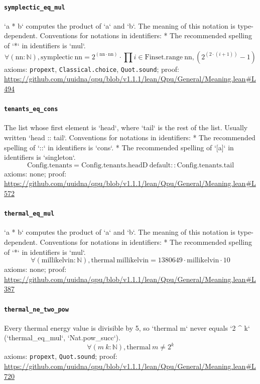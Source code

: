 \documentclass[11pt]{article}
\begin{document}
\paragraph{\texttt{symplectic\_eq\_mul}}
`a * b` computes the product of `a` and `b`. The meaning of this notation is type-dependent.   Conventions for notations in identifiers:   * The recommended spelling of `*` in identifiers is `mul`.
\[ \forall (\mathrm{nn} : \mathbb{N}), \mathrm{symplectic}\ \mathrm{nn} = 2 ^{(\mathrm{nn} \cdot \mathrm{nn})} \cdot \prod i \in \mathrm{Finset.range}\ \mathrm{nn}, (2 ^{(2 \cdot (i + 1))} - 1) \]
\noindent axioms: \texttt{propext}, \texttt{Classical.choice}, \texttt{Quot.sound}; proof: \url{https://github.com/uuidna/qpu/blob/v1.1.1/lean/Qpu/General/Meaning.lean\#L494}

\paragraph{\texttt{tenants\_eq\_cons}}
The list whose first element is `head`, where `tail` is the rest of the list. Usually written `head :: tail`.   Conventions for notations in identifiers:   * The recommended spelling of `::` in identifiers is `cons`.   * The recommended spelling of `[a]` in identifiers is `singleton`.
\[ \mathrm{Config.tenants} = \mathrm{Config.tenants.headD}\ \mathrm{default} :: \mathrm{Config.tenants.tail} \]
\noindent axioms: none; proof: \url{https://github.com/uuidna/qpu/blob/v1.1.1/lean/Qpu/General/Meaning.lean\#L572}

\paragraph{\texttt{thermal\_eq\_mul}}
`a * b` computes the product of `a` and `b`. The meaning of this notation is type-dependent.   Conventions for notations in identifiers:   * The recommended spelling of `*` in identifiers is `mul`.
\[ \forall (\mathrm{millikelvin} : \mathbb{N}), \mathrm{thermal}\ \mathrm{millikelvin} = 1380649 \cdot \mathrm{millikelvin} \cdot 10 \]
\noindent axioms: none; proof: \url{https://github.com/uuidna/qpu/blob/v1.1.1/lean/Qpu/General/Meaning.lean\#L387}

\paragraph{\texttt{thermal\_ne\_two\_pow}}
Every thermal energy value is divisible by 5, so `thermal m` never equals `2 \^{} k` (`thermal\_eq\_mul`, `Nat.pow\_succ`).
\[ \forall (m\ k : \mathbb{N}), \mathrm{thermal}\ m \ne 2 ^{k} \]
\noindent axioms: \texttt{propext}, \texttt{Quot.sound}; proof: \url{https://github.com/uuidna/qpu/blob/v1.1.1/lean/Qpu/General/Meaning.lean\#L720}
\end{document}
